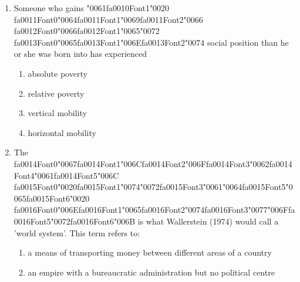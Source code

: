 \documentclass[12pt]{article}
\begin{document}
\begin{enumerate}[label=\arabic*.]
\begin{enumerate}[label=(\alph*)]
    \item the media exaggerate reports of deviant groups, generating hostile reactions
    \item children watch violent or sexually explicit films and then copy the behaviour
    \item audiences challenge the ethnic stereotypes represented by the media
    \item elitists express concern with the Americanization of culture
\end{enumerate}
\item Someone who gains {\char"0061}{\csname fa0010Font1\endcsname\char"0020} {\csname fa0011Font0\endcsname\char"0064}{\csname fa0011Font1\endcsname\char"0069}{\csname fa0011Font2\endcsname\char"0066} {\csname fa0012Font0\endcsname\char"0066}{\csname fa0012Font1\endcsname\char"0065}{\char"0072} {\csname fa0013Font0\endcsname\char"0065}{\csname fa0013Font1\endcsname\char"006E}{\csname fa0013Font2\endcsname\char"0074} social position than he or she was born into has experienced
\begin{enumerate}[label=(\alph*)]
    \item absolute poverty
    \item relative poverty
    \item vertical mobility
    \item horizontal mobility
\end{enumerate}
\item The {\csname fa0014Font0\endcsname\char"0067}{\csname fa0014Font1\endcsname\char"006C}{\csname fa0014Font2\endcsname\char"006F}{\csname fa0014Font3\endcsname\char"0062}{\csname fa0014Font4\endcsname\char"0061}{\csname fa0014Font5\endcsname\char"006C} {\csname fa0015Font0\endcsname\char"0020}{\csname fa0015Font1\endcsname\char"0074}{\char"0072}{\csname fa0015Font3\endcsname\char"0061}{\char"0064}{\csname fa0015Font5\endcsname\char"0065}{\csname fa0015Font6\endcsname\char"0020} {\csname fa0016Font0\endcsname\char"006E}{\csname fa0016Font1\endcsname\char"0065}{\csname fa0016Font2\endcsname\char"0074}{\csname fa0016Font3\endcsname\char"0077}{\char"006F}{\csname fa0016Font5\endcsname\char"0072}{\csname fa0016Font6\endcsname\char"006B} is what Wallerstein (1974) would call a 'world system'. This term refers to:
\begin{enumerate}[label=(\alph*)]
    \item a means of transporting money between different areas of a country
    \item an empire with a bureaucratic administration but no political centre

\end{enumerate}
\end{enumerate}
\end{document}
